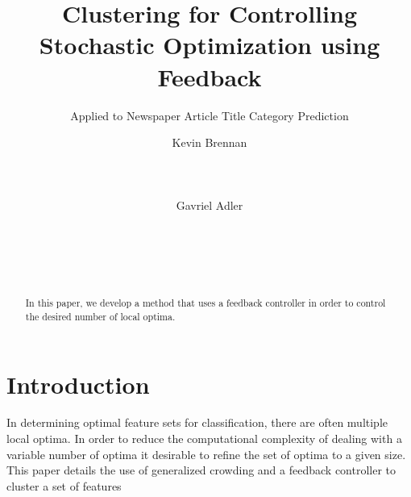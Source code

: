 \documentclass{sig-alternate}
\begin{document}
%

\title{Clustering for Controlling Stochastic Optimization using Feedback}
\subtitle{Applied to Newspaper Article Title Category Prediction}

\author{
\alignauthor
Kevin Brennan\\
       \\
       \\
       \\
\alignauthor
Gavriel Adler\\
       \\
       \\
       \\
       \\
}


\maketitle
\begin{abstract}
In this paper, we develop a method that uses a feedback controller in order to control the desired number
of local optima.
\end{abstract}




\section{Introduction}
In determining optimal feature sets for classification, there are often multiple local optima. In order to reduce the computational complexity of dealing with a variable number of optima it desirable to refine the set of optima to a given size. This paper details the use of generalized crowding and a feedback controller to cluster a set of features
\end{document}
